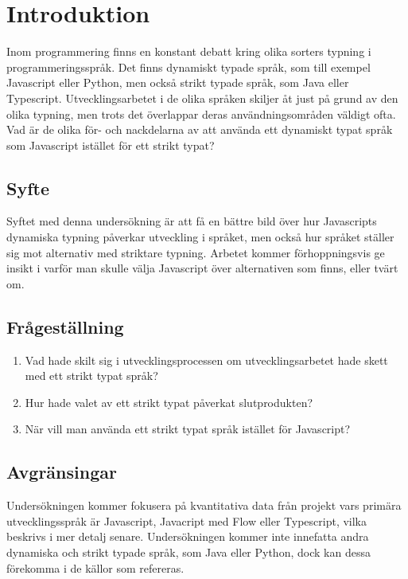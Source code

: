 \section{Introduktion}
\label{sec:alexander-introduction}
Inom programmering finns en konstant debatt kring olika sorters typning i programmeringsspråk. Det finns dynamiskt typade språk, som till exempel Javascript eller Python, men också strikt typade språk, som Java eller Typescript. Utvecklingsarbetet i de olika språken skiljer åt just på grund av den olika typning, men trots det överlappar deras användningsområden väldigt ofta. Vad är de olika för- och nackdelarna av att använda ett dynamiskt typat språk som Javascript istället för ett strikt typat?

\subsection{Syfte}
\label{subsec:motivation}

Syftet med denna undersökning är att få en bättre bild över hur Javascripts dynamiska typning påverkar utveckling i språket, men också hur språket ställer sig mot alternativ med striktare typning. Arbetet kommer förhoppningsvis ge insikt i varför man skulle välja Javascript över alternativen som finns, eller tvärt om.

\subsection{Frågeställning}
\label{subsec:research-questions}

\begin{enumerate}
\item Vad hade skilt sig i utvecklingsprocessen om utvecklingsarbetet hade skett med ett strikt typat språk?

\item Hur hade valet av ett strikt typat påverkat slutprodukten?

\item När vill man använda ett strikt typat språk istället för Javascript?

\end{enumerate}


\subsection{Avgränsingar}
\label{subsec:delimitations}

Undersökningen kommer fokusera på kvantitativa data från projekt vars primära utvecklingsspråk är Javascript, Javacript med Flow eller Typescript, vilka beskrivs i mer detalj senare. Undersökningen kommer inte innefatta andra dynamiska och strikt typade språk, som Java eller Python, dock kan dessa förekomma i de källor som refereras.




